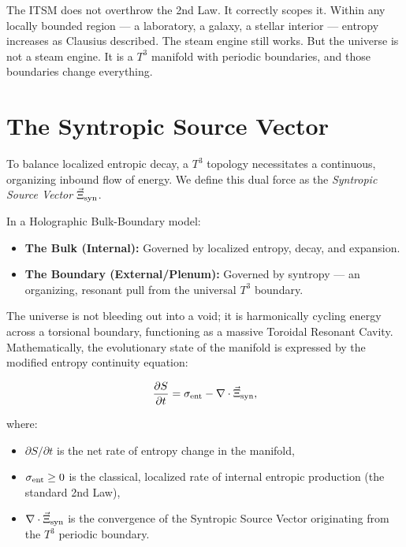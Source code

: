 \documentclass[aps,prd,11pt,onecolumn,superscriptaddress,nofootinbib,floatfix]{revtex4-2}
\begin{document}
The ITSM does not overthrow the 2nd Law. It correctly scopes it. Within any locally bounded region --- a laboratory, a galaxy, a stellar interior --- entropy increases as Clausius described. The steam engine still works. But the universe is not a steam engine. It is a $T^3$ manifold with periodic boundaries, and those boundaries change everything.

\section{The Syntropic Source Vector}
\label{sec:syntropy}

To balance localized entropic decay, a $T^3$ topology necessitates a continuous, organizing inbound flow of energy. We define this dual force as the \textit{Syntropic Source Vector} $\vec{\Xi}_{\rm syn}$.

In a Holographic Bulk-Boundary model:
\begin{itemize}
    \item \textbf{The Bulk (Internal):} Governed by localized entropy, decay, and expansion.
    \item \textbf{The Boundary (External/Plenum):} Governed by syntropy --- an organizing, resonant pull from the universal $T^3$ boundary.
\end{itemize}

The universe is not bleeding out into a void; it is harmonically cycling energy across a torsional boundary, functioning as a massive Toroidal Resonant Cavity. Mathematically, the evolutionary state of the manifold is expressed by the modified entropy continuity equation:

\begin{equation}
    \frac{\partial S}{\partial t} = \sigma_{\rm ent} - \nabla \cdot \vec{\Xi}_{\rm syn},
    \label{eq:entropy_balance}
\end{equation}

where:
\begin{itemize}
    \item $\partial S/\partial t$ is the net rate of entropy change in the manifold,
    \item $\sigma_{\rm ent} \ge 0$ is the classical, localized rate of internal entropic production (the standard 2nd Law),
    \item $\nabla \cdot \vec{\Xi}_{\rm syn}$ is the convergence of the Syntropic Source Vector originating from the $T^3$ periodic boundary.
\end{itemize}
\end{document}
